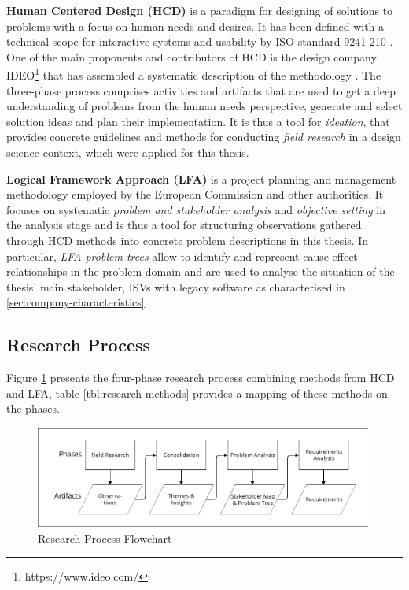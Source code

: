\textbf{Human Centered Design (HCD)} is a paradigm for designing of solutions to problems with a focus on human needs and desires.
It has been defined with a technical scope for interactive systems and usability by ISO standard 9241-210 \autocite{ISO9241-210HCD}.
One of the main proponents and contributors of HCD is the design company IDEO\footnote{https://www.ideo.com/} that has assembled a systematic description of the methodology \autocite{HCD2015}.
The three-phase process comprises activities and artifacts that are used to get a deep understanding of problems from the human needs perspective, generate and select solution ideas and plan their implementation.
It is thus a tool for \emph{ideation}, that provides concrete guidelines and methods for conducting \emph{field research} in a design science context, which were applied for this thesis.

\textbf{Logical Framework Approach (LFA)} is a project planning and management methodology employed by the European Commission \autocite{Commission2004PCM} and other authorities.
It focuses on systematic \emph{problem and stakeholder analysis} and \emph{objective setting} in the analysis stage and is thus a tool for structuring observations gathered through HCD methods into concrete problem descriptions in this thesis.
In particular, \emph{LFA problem trees} allow to identify and represent cause-effect-relationships in the problem domain and are used to analyse the situation of the thesis' main stakeholder, ISVs with legacy software as characterised in \cref{sec:company-characteristics}.

\hypertarget{sec:research-process}{%
\subsection{Research Process}\label{sec:research-process}}

Figure \cref{fig:research-process} presents the four-phase research process combining methods from HCD and LFA, table \cref{tbl:research-methods} provides a mapping of these methods on the phases.

\begin{figure}
\hypertarget{fig:research-process}{%
\centering
\includegraphics[width=0.99\textwidth]{../figures/20180115-DRF-Research-Process-Flow.pdf}
\caption{Research Process Flowchart}\label{fig:research-process}
}
\end{figure}

